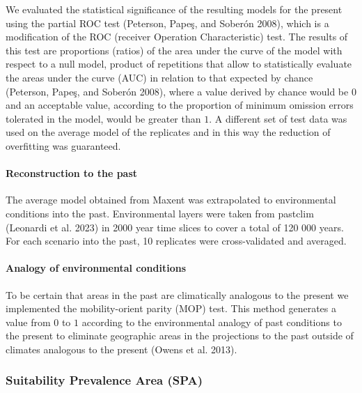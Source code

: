 \documentclass[
]{article}
\begin{document}
We evaluated the statistical significance of the resulting models for
the present using the partial ROC test (Peterson, Papeş, and Soberón
2008), which is a modification of the ROC (receiver Operation
Characteristic) test. The results of this test are proportions (ratios)
of the area under the curve of the model with respect to a null model,
product of repetitions that allow to statistically evaluate the areas
under the curve (AUC) in relation to that expected by chance (Peterson,
Papeş, and Soberón 2008), where a value derived by chance would be \(0\)
and an acceptable value, according to the proportion of minimum omission
errors tolerated in the model, would be greater than \(1\). A different
set of test data was used on the average model of the replicates and in
this way the reduction of overfitting was guaranteed.

\hypertarget{reconstruction-to-the-past}{%
\paragraph{Reconstruction to the
past}\label{reconstruction-to-the-past}}

The average model obtained from Maxent was extrapolated to environmental
conditions into the past. Environmental layers were taken from pastclim
(Leonardi et al. 2023) in 2000 year time slices to cover a total of 120
000 years. For each scenario into the past, 10 replicates were
cross-validated and averaged.

\hypertarget{analogy-of-environmental-conditions}{%
\paragraph{Analogy of environmental
conditions}\label{analogy-of-environmental-conditions}}

To be certain that areas in the past are climatically analogous to the
present we implemented the mobility-orient parity (MOP) test. This
method generates a value from \(0\) to \(1\) according to the
environmental analogy of past conditions to the present to eliminate
geographic areas in the projections to the past outside of climates
analogous to the present (Owens et al. 2013).

\hypertarget{suitability-prevalence-area-spa}{%
\subsubsection{Suitability Prevalence Area
(SPA)}\label{suitability-prevalence-area-spa}}
\end{document}
